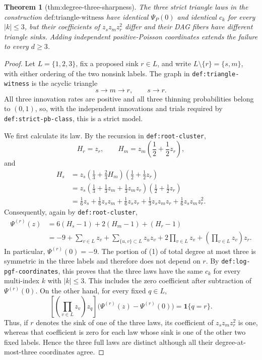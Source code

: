 \documentclass{article}
\newtheorem{theorem}{Theorem}
\begin{document}
\begin{theorem}[thm:degree-three-sharpness]\label{thm:degree-three-sharpness}
The three strict triangle laws in the construction \(\text{def:triangle-witness}\) have identical \(\Psi_P(0)\) and identical \(c_k\) for every \(|k|\le3\), but their coefficients of \(z_s z_m z_r^2\) differ and their DAG fibers have different triangle sinks. Adding independent positive-Poisson coordinates extends the failure to every \(d\ge3\).
\end{theorem}
\begin{proof}
Let \(L=\{1,2,3\}\), fix a proposed sink \(r\in L\), and write \(L\setminus\{r\}=\{s,m\}\), with either ordering of the two nonsink labels.  The graph in \texttt{def:triangle-witness} is the acyclic triangle
\[
s\longrightarrow m\longrightarrow r,
\qquad s\longrightarrow r.
\]
All three innovation rates are positive and all three thinning probabilities belong to \((0,1)\), so, with the independent innovations and trials required by \texttt{def:strict-pb-class}, this is a strict model.

We first calculate its law.  By the recursion in \texttt{def:root-cluster},
\[
H_r=z_r,
\qquad
H_m=z_m\left(\frac12+\frac12z_r\right),
\]
and
\[
\begin{aligned}
H_s
&=z_s\left(\frac13+\frac23H_m\right)
          \left(\frac12+\frac12z_r\right)\\
&=z_s\left(\frac13+\frac13z_m+\frac13z_mz_r\right)
          \left(\frac12+\frac12z_r\right)\\
&=\frac16z_s+\frac16z_sz_m+\frac16z_sz_r
  +\frac13z_sz_mz_r+\frac16z_sz_mz_r^2.
\end{aligned}
\]
Consequently, again by \texttt{def:root-cluster},
\[
\begin{aligned}
\Psi^{(r)}(z)
&=6(H_s-1)+2(H_m-1)+(H_r-1)\\
&=-9+\sum_{v\in L}z_v
  +\sum_{\{u,v\}\subset L}z_uz_v
  +2\prod_{v\in L}z_v
  +\left(\prod_{v\in L}z_v\right)z_r.
\end{aligned}
\tag{1}
\]
In particular, \(\Psi^{(r)}(0)=-9\).  The portion of (1) of total degree at most three is symmetric in the three labels and therefore does not depend on \(r\).  By \texttt{def:log-pgf-coordinates}, this proves that the three laws have the same \(c_k\) for every multi-index \(k\) with \(|k|\leq 3\).  This includes the zero coefficient after subtraction of \(\Psi^{(r)}(0)\).  On the other hand, for every fixed \(q\in L\),
\[
\left[\left(\prod_{v\in L}z_v\right)z_q\right]
\bigl(\Psi^{(r)}(z)-\Psi^{(r)}(0)\bigr)
=\mathbf 1\{q=r\}.
\tag{2}
\]
Thus, if \(r\) denotes the sink of one of the three laws, its coefficient of \(z_sz_mz_r^2\) is one, whereas that coefficient is zero for each law whose sink is one of the other two fixed labels.  Hence the three full laws are distinct although all their degree-at-most-three coordinates agree.


\end{proof}
\end{document}
